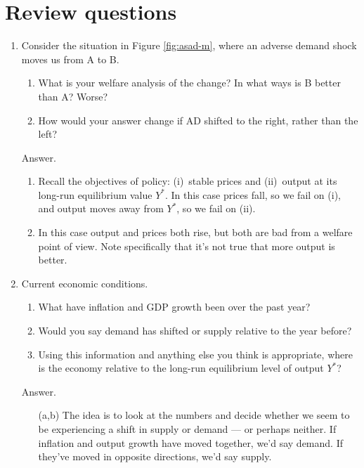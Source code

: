 \section*{Review questions}

\begin{enumerate}
\item Consider the situation in Figure \ref{fig:asad-m},
where an adverse demand shock moves us from A to B.
\begin{enumerate}
\item What is your welfare analysis of the change?
In what ways is B better than A?  Worse?
\item How would your answer change if AD shifted to the right,
rather than the left?
\end{enumerate}

Answer.
\begin{enumerate}
\item Recall the objectives of policy:  (i)~stable prices
and (ii)~output at its long-run equilibrium value $Y^*$.
In this case prices fall, so we fail on (i), and output moves
away from $Y^*$, so we fail on (ii).
\item In this case output and prices both rise,
but both are bad from a welfare point of view.
Note specifically that it's not true that more output is better.
\end{enumerate}

\item Current economic conditions.
\begin{enumerate}
\item What have inflation and GDP growth been over the past year?
\item Would you say demand has shifted or supply relative to the year before?
\item Using this information and anything else you think is appropriate,
where is the economy relative to the long-run equilibrium level of output $Y^*$?
\end{enumerate}

Answer.
\begin{enumerate}
\item [(a,b)] The idea is to look at the numbers and decide whether
we seem to be experiencing a shift in supply or demand --- or perhaps neither.
If inflation and output growth have moved together, we'd say demand.
If they've moved in opposite directions, we'd say supply.


\end{enumerate}
\end{enumerate}
